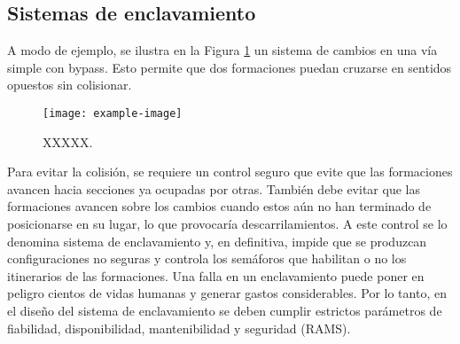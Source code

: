 \subsection{Sistemas de enclavamiento}

A modo de ejemplo, se ilustra en la Figura \ref{fig:enclavamiento_1} un sistema de cambios en una vía simple con bypass. Esto permite que dos formaciones puedan cruzarse en sentidos opuestos sin colisionar.

    \begin{figure}[h]
        \centering
        \texttt{[image: example-image]}
        \centering\caption{XXXXX.}
        \label{fig:enclavamiento_1}
    \end{figure}

Para evitar la colisión, se requiere un control seguro que evite que las formaciones avancen hacia secciones ya ocupadas por otras. También debe evitar que las formaciones avancen sobre los cambios cuando estos aún no han terminado de posicionarse en su lugar, lo que provocaría descarrilamientos. A este control se lo denomina sistema de enclavamiento y, en definitiva, impide que se produzcan configuraciones no seguras y controla los semáforos que habilitan o no los itinerarios de las formaciones. Una falla en un enclavamiento puede poner en peligro cientos de vidas humanas y generar gastos considerables. Por lo tanto, en el diseño del sistema de enclavamiento se deben cumplir estrictos parámetros de fiabilidad, disponibilidad, mantenibilidad y seguridad (RAMS).
    





